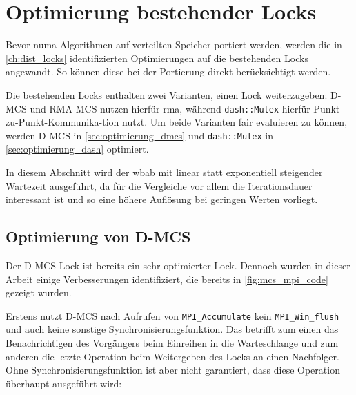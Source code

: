 \section{Optimierung bestehender Locks}
\label{sec:optimierung_bestehender_locks}

Bevor \gls{numa}-Algorithmen auf verteilten Speicher portiert werden,
werden die in \autoref{ch:dist_locks} identifizierten Optimierungen auf die bestehenden Locks angewandt.
So können diese bei der Portierung direkt berücksichtigt werden.

Die bestehenden Locks enthalten zwei Varianten,
einen Lock weiterzugeben:
D-MCS und RMA-MCS nutzen hierfür \gls{rma},
während \texttt{dash::Mutex} hierfür Punkt-zu-Punkt-Kommunika-tion nutzt.
Um beide Varianten fair evaluieren zu können,
werden D-MCS in \autoref{sec:optimierung_dmcs} und \texttt{dash::Mutex} in \autoref{sec:optimierung_dash} optimiert.

In diesem Abschnitt wird der \gls{wbab} mit linear statt exponentiell steigender Wartezeit ausgeführt,
da für die Vergleiche vor allem die Iterationsdauer interessant ist
und so eine höhere Auflösung bei geringen Werten vorliegt.

\subsection{Optimierung von D-MCS}
\label{sec:optimierung_dmcs}

Der D-MCS-Lock ist bereits ein sehr optimierter Lock.
Dennoch wurden in dieser Arbeit einige Verbesserungen identifiziert,
die bereits in \autoref{fig:mcs_mpi_code} gezeigt wurden.

Erstens nutzt D-MCS nach Aufrufen von \texttt{MPI\_Accumulate} kein \texttt{MPI\_Win\_flush}
und auch keine sonstige Synchronisierungsfunktion.
Das betrifft zum einen das Benachrichtigen des Vorgängers beim Einreihen in die Warteschlange
und zum anderen die letzte Operation beim Weitergeben des Locks an einen Nachfolger.
Ohne Synchronisierungsfunktion ist aber nicht garantiert,
dass diese Operation überhaupt ausgeführt wird:

\clearpage

